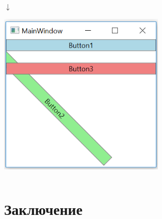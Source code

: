\documentclass[xetex,mathserif,serif]{beamer}
\newcommand{\DownArrow} {
	\hspace{2cm}\begin{LARGE}$\downarrow$\end{LARGE}
}
\begin{document}
\begin{frame}[fragile]
\begin{columns}
\begin{column}{0.5\textwidth}
				\DownArrow
				\begin{center}
					\includegraphics[width=0.6\textwidth]{renderTransform.png}
				\end{center}
			\end{column}
		\end{columns}
	\end{frame}

	\section{Заключение}
	
\end{document}
